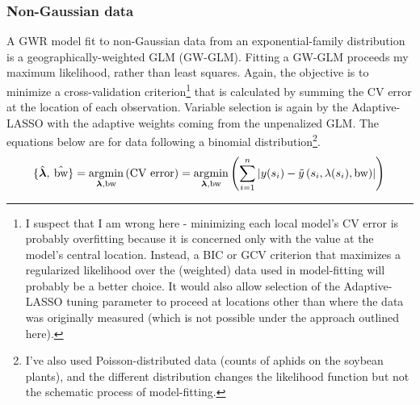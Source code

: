 \documentclass[10pt]{amsart}
\DeclareMathOperator*{\argmin}{\arg\!\min}
\DeclareMathOperator*{\bw}{\mbox{bw}}
\newcommand{\vect}[1]{\boldsymbol{#1}}
\begin{document}
		\subsubsection{Non-Gaussian data} A GWR model fit to non-Gaussian data from an exponential-family distribution is a geographically-weighted GLM (GW-GLM). Fitting a GW-GLM proceeds my maximum likelihood, rather than least squares. Again, the objective is to minimize a cross-validation criterion\footnote{I suspect that I am wrong here - minimizing each local model's CV error is probably overfitting because it is concerned only with the value at the model's central location. Instead, a BIC or GCV criterion that maximizes a regularized likelihood over the (weighted) data used in model-fitting will probably be a better choice. It would also allow selection of the Adaptive-LASSO tuning parameter to proceed at locations other than where the data was originally measured (which is not possible under the approach outlined here).} that is calculated by summing the CV error at the location of each observation. Variable selection is again by the Adaptive-LASSO with the adaptive weights coming from the unpenalized GLM. The equations below are for data following a binomial distribution\footnote{I've also used Poisson-distributed data (counts of aphids on the soybean plants), and the different distribution changes the likelihood function but not the schematic process of model-fitting.}.	
		\[
			\{ \hat{\vect{\lambda}}, \: \hat{\bw} \} = \argmin_{\vect{\lambda}, \text{bw}} \left( \mbox{CV error} \right)  = \argmin_{\vect{\lambda}, \text{bw}} \left( \sum_{i = 1}^n \left| y(s_i)-\tilde{y} \left(s_i, \lambda(s_i), \bw \right) \right| \right)\\
		\]	
		
\end{document}
